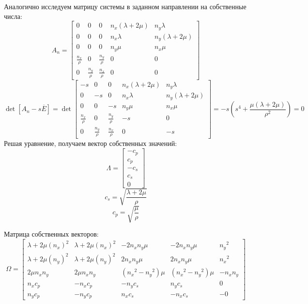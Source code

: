 \documentclass{article}
\begin{document}
Аналогично исследуем матрицу системы в заданном направлении на собственные числа:
\begin{equation}
 A_n = \left[\begin{array}{crlcc}
0 & 0 & 0 & n_x (\lambda + 2 \mu ) & n_y \lambda \\
0 & 0 & 0 & n_x \lambda & n_y  (\lambda + 2 \mu)\\
0 & 0 & 0 & n_y \mu & n_x \mu \\
\frac{n_x}{\rho} & 0 & \frac{n_y}{\rho} & 0 & 0 \\
0 &  \frac{n_y}{\rho} & \frac{n_x}{\rho} & 0 & 0 
\end{array}\right] 
\end{equation}
\begin{equation}
\det[A_n - s \overline{E}] = \det\left[\begin{array}{crlcc}
-s & 0 & 0 & n_x (\lambda + 2 \mu ) & n_y \lambda \\
0 & -s & 0 & n_x \lambda & n_y  (\lambda + 2 \mu)\\
0 & 0 & -s & n_y \mu & n_x \mu \\
\frac{n_x}{\rho} & 0 & \frac{n_y}{\rho} & -s & 0 \\
0 &  \frac{n_y}{\rho} & \frac{n_x}{\rho} & 0 & -s 
\end{array}\right] = -s (s^4 + \frac{\mu (\lambda + 2\mu)}{\rho^2}) = 0 
\end{equation}
Решая уравнение, получаем вектор собственных значений:
\begin{equation}
\Lambda = \left[\begin{array}{crl}
-c_p \\
c_p \\
-c_s \\
c_s \\
0
\end{array}\right] 
\end{equation}
\begin{equation}
 c_s = \sqrt{\frac{\lambda + 2 \mu}{\rho}} 
 \end{equation}
 \begin{equation}
c_p =  \sqrt{\frac{\mu}{\rho}}
\end{equation}

Матрица собственных векторов:
\begin{equation}
\Omega = \left[\begin{array}{crlcc}
\lambda + 2\mu(n_x)^2 & \lambda + 2\mu(n_x)^2 & -2 n_x n_y \mu & -2 n_x n_y \mu & {n_y}^2\\
\lambda + 2\mu(n_y)^2 & \lambda + 2\mu(n_y)^2 & 2 n_x n_y \mu & 2 n_x n_y \mu  & {n_x}^2\\
2 \mu n_x n_y & 2 \mu n_x n_y & ({n_x}^2 - {n_y}^2)\mu & ({n_x}^2 - {n_y}^2)\mu & -n_x n_y \\
n_x c_p & - n_x c_p & -n_y c_s & n_y c_s & 0 \\
n_y c_p & - n_y c_p & n_x c_s & - n_x c_s & -0 
\end{array}\right] 
\end{equation}
\end{document}
